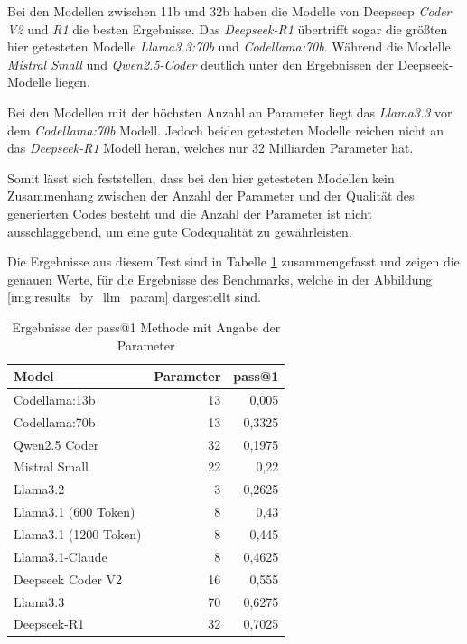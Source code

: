 Bei den Modellen zwischen 11b und 32b haben die Modelle von Deepseep \textit{Coder V2} und \textit{R1} die besten Ergebnisse. Das \textit{Deepseek-R1} übertrifft sogar die größten hier getesteten Modelle \textit{Llama3.3:70b} und \textit{Codellama:70b}. Während die Modelle \textit{Mistral Small} und \textit{Qwen2.5-Coder} deutlich unter den Ergebnissen der Deepseek-Modelle liegen.\vspace{0.2cm}

Bei den Modellen mit der höchsten Anzahl an Parameter liegt das \textit{Llama3.3} vor dem \textit{Codellama:70b} Modell. Jedoch beiden getesteten Modelle reichen nicht an das \textit{Deepseek-R1} Modell heran, welches nur 32 Milliarden Parameter hat.\vspace{0.2cm}

Somit lässt sich feststellen, dass bei den hier getesteten Modellen kein Zusammenhang zwischen der Anzahl der Parameter und der Qualität des generierten Codes besteht und die Anzahl der Parameter ist nicht ausschlaggebend, um eine gute Codequalität zu gewährleisten.\vspace{0.2cm}

Die Ergebnisse aus diesem Test sind in Tabelle \ref{tab:prompt_results_open_models_by_param} zusammengefasst und zeigen die genauen Werte, für die Ergebnisse des Benchmarks, welche in der Abbildung \ref{img:results_by_llm_param} dargestellt sind.

\begin{table}[!ht]
	\begin{tabular}{|l|r|r|}
		\hline
		\textbf{Model} & \textbf{Parameter} & \textbf{pass@1} \\
		\hline
		Codellama:13b         & 13 &  0,005 \\
		Codellama:70b         & 13 & 0,3325 \\
		Qwen2.5 Coder         & 32 & 0,1975 \\
		Mistral Small         & 22 &   0,22 \\
		Llama3.2              &  3 & 0,2625 \\
		Llama3.1 (600 Token)  &  8 &   0,43 \\
		Llama3.1 (1200 Token) &  8 &  0,445 \\
		Llama3.1-Claude       &  8 & 0,4625 \\
		Deepseek Coder V2     & 16 &  0,555 \\
		Llama3.3              & 70 & 0,6275 \\
		Deepseek-R1           & 32 & 0,7025 \\
		\hline
		\hline
	\end{tabular}
	\centering
	\label{tab:prompt_results_open_models_by_param}
	\caption{Ergebnisse der pass@1 Methode mit Angabe der Parameter}
\end{table}


